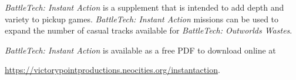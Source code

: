 \emph{BattleTech: Instant Action} is a supplement that is intended to add depth and variety to pickup games.
\emph{BattleTech: Instant Action} missions can be used to expand the number of casual tracks available for \emph{BattleTech: Outworlds Wastes}.

\emph{BattleTech: Instant Action} is available as a free PDF to download online at

 \href{https://victorypointproductions.neocities.org/instantaction}{https://victorypointproductions.neocities.org/instantaction}.
